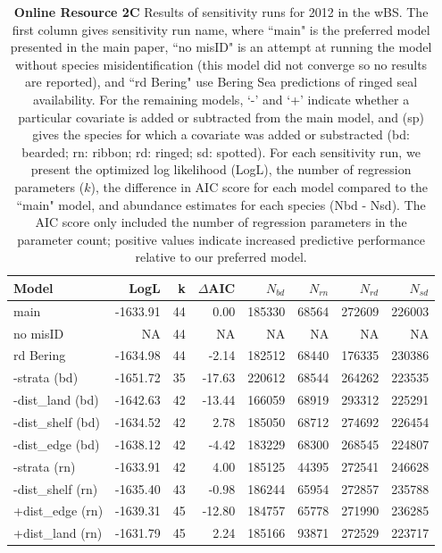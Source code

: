 \documentclass{svjour3}
\begin{document}
\begin{table}[htbp]
\centering
\caption{\textbf{Online Resource 2C} Results of sensitivity runs for 2012 in the wBS. The first column gives sensitivity run name, where ``main" is the preferred model presented in the main paper, ``no misID" is an attempt at running the model without species misidentification (this model did not converge so no results are reported), and ``rd Bering" use Bering Sea predictions of ringed seal availability.  For the remaining models, `-' and `+' indicate whether a particular covariate is added or subtracted from the main model, and (sp) gives the species for which a covariate was added or substracted (bd: bearded; rn: ribbon; rd: ringed; sd: spotted).  For each sensitivity run, we present the optimized log likelihood (LogL), the number of regression parameters ($k$), the difference in AIC score for each model compared to the ``main" model, and abundance estimates for each species (Nbd - Nsd).  The AIC score only included the number of regression parameters in the parameter count; positive values indicate increased predictive performance relative to our preferred model.}
\begin{tabular}{lrrrrrrr}
  \hline
Model & LogL & k & $\Delta$AIC & $N_{bd}$ & $N_{rn}$ & $N_{rd}$ & $N_{sd}$ \\
  \hline
main & -1633.91 & 44 & 0.00 & 185330 & 68564 & 272609 & 226003 \\
  no misID & NA & 44 & NA & NA & NA & NA & NA \\
  rd Bering & -1634.98 & 44 & -2.14 & 182512 & 68440 & 176335 & 230386 \\
  -strata (bd) & -1651.72 & 35 & -17.63 & 220612 & 68544 & 264262 & 223535 \\
  -dist\_land (bd) & -1642.63 & 42 & -13.44 & 166059 & 68919 & 293312 & 225291 \\
  -dist\_shelf (bd) & -1634.52 & 42 & 2.78 & 185050 & 68712 & 274692 & 226454 \\
  -dist\_edge (bd) & -1638.12 & 42 & -4.42 & 183229 & 68300 & 268545 & 224807 \\
  -strata (rn) & -1633.91 & 42 & 4.00 & 185125 & 44395 & 272541 & 246628 \\
  -dist\_shelf (rn) & -1635.40 & 43 & -0.98 & 186244 & 65954 & 272857 & 235788 \\
  +dist\_edge (rn) & -1639.31 & 45 & -12.80 & 184757 & 65778 & 271990 & 236285 \\
  +dist\_land (rn) & -1631.79 & 45 & 2.24 & 185166 & 93871 & 272529 & 223717 \\

\end{tabular}
\end{table}
\end{document}
